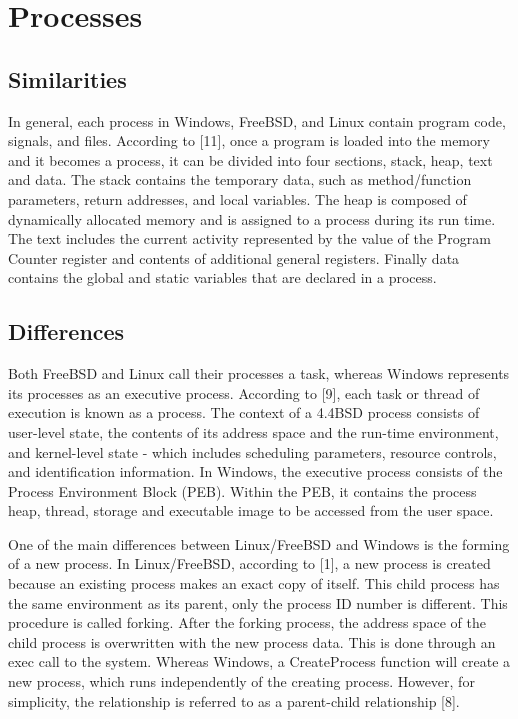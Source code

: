 \documentclass[onecolumn, draftclsnofoot,10pt, compsoc]{IEEEtran}
\begin{document}
\section{Processes}

\subsection{Similarities}

In general, each process in Windows, FreeBSD, and Linux contain program code, signals, and files. According to [11], once a program is loaded into the memory and it becomes a process, it can be divided into four sections, stack, heap, text and data. The stack contains the temporary data, such as method/function parameters, return addresses, and local variables. The heap is composed of dynamically allocated memory and is assigned to a process during its run time. The text includes the current activity represented by the value of the Program Counter register and contents of additional general registers. Finally data contains the global and static variables that are declared in a process.

\subsection{Differences}

Both FreeBSD and Linux call their processes a task, whereas Windows represents its processes as an executive process. According to [9], each task or thread of execution is known as a process. The context of a 4.4BSD process consists of user-level state, the contents of its address space and the run-time environment, and kernel-level state - which includes scheduling parameters, resource controls, and identification information. In Windows, the executive process consists of the Process Environment Block (PEB). Within the PEB, it contains the process heap, thread, storage and executable image to be accessed from the user space. 

One of the main differences between Linux/FreeBSD and Windows is the forming of a new process. In Linux/FreeBSD, according to [1], a new process is created because an existing process makes an exact copy of itself. This child process has the same environment as its parent, only the process ID number is different. This procedure is called forking. After the forking process, the address space of the child process is overwritten with the new process data. This is done through an exec call to the system. Whereas Windows, a CreateProcess function will create a new process, which runs independently of the creating process. However, for simplicity, the relationship is referred to as a parent-child relationship [8].
\end{document}
